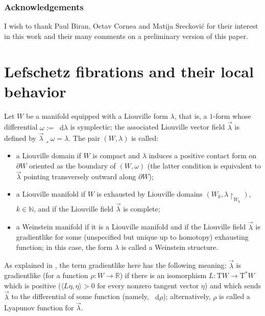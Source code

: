 \documentclass[10pt]{amsart}
\newcommand{\N}{{\mathbb N}}
\newcommand{\R}{{\mathbb R}}
\newcommand{\sT}{\mathrm{T}^\ast}
\newcommand{\rT}{\mathrm{T}}
\renewcommand{\d}{\mathop{}\!\mathrm d}
\newcommand{\dlambda}{\d\lambda}
\newcommand{\drho}{\d\rho}
\newcommand{\prg}[1]{\langle #1 \rangle}
\newcommand{\de}{\mathrel{:=}}
\newcommand{\rst}[1]{{\upharpoonright}_{\!#1}}
\newcommand{\hook}{\mathbin{\lrcorner}}
\let\del\partial
\let\on\colon
\theoremstyle{plain}
\theoremstyle{definition}
\begin{document}
\subsubsection*{Acknowledgements}

I wish to thank Paul Biran, Octav Cornea and Matija Sreckovi\'c for their
interest in this work and their many comments on a preliminary version of this
paper.

\section{Lefschetz fibrations and their local behavior} \label{s:slf}

Let $W$ be a manifold equipped with a Liouville form $\lambda$, that is, a
$1$-form whose differential $\omega \de \dlambda$ is symplectic; the associated
Liouville vector field $\vec\lambda$ is defined by $\vec\lambda \hook \omega =
\lambda$. The pair $(W,\lambda)$ is called:
\begin{itemize}
\item
a Liouville domain if $W$ is compact and $\lambda$ induces a positive contact
form on $\del W$ oriented as the boundary of $(W,\omega)$ (the latter condition
is equivalent to $\vec\lambda$ pointing transversely outward along $\del W$);
\item
a Liouville manifold if $W$ is exhausted by Liouville domains $(W_k, \lambda
\rst{ W_k })$, $k \in \N$, and if the Liouville field $\vec\lambda$ is complete;
\item
a Weinstein manifold if it is a Liouville manifold and if the Liouville field
$\vec\lambda$ is gradientlike for some (unspecified but unique up to homotopy)
exhausting function; in this case, the form $\lambda$ is called a Weinstein
structure.
\end{itemize}
As explained in \cite{Ci}, the term gradientlike here has the following meaning:
$\vec\lambda$ is gradientlike (for a function $\rho \on W \to \R$) if there is
an isomorphism $L \on \rT W \to \sT W$ which is positive ($\prg{ L\eta, \eta }
> 0$ for every nonzero tangent vector $\eta$) and which sends $\vec\lambda$ to
the differential of some function (namely, $\drho$); alternatively, $\rho$ is
called a Lyapunov function for $\vec\lambda$.
\end{document}
